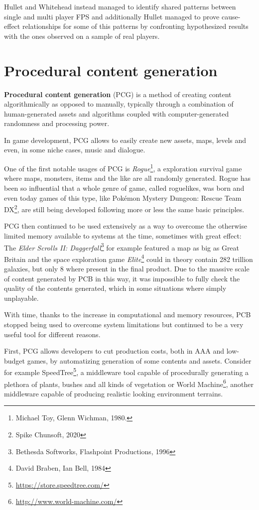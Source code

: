 Hullet and Whitehead \citep{design_patterns_fps} instead managed to identify shared patterns between single and multi player FPS and additionally Hullet \cite{science_level_design} managed to prove cause-effect relationships for some of this patterns by confronting hypothesized results with the ones observed on a sample of real players.


\section{Procedural content generation}

\textbf{Procedural content generation} (PCG) is a method of creating content algorithmically as opposed to manually, typically through a combination of human-generated assets and algorithms coupled with computer-generated randomness and processing power.

In game development, PCG allows to easily create new assets, maps, levels and even, in some niche cases, music and dialogue.

One of the first notable usages of PCG is \textit{Rogue}\footnote{Michael Toy, Glenn Wichman, 1980.}, a exploration survival game where maps, monsters, items and the like are all randomly generated. Rogue has been so influential that a whole genre of game, called roguelikes, was born and even today games of this type, like Pokémon Mystery Dungeon: Rescue Team DX\footnote{Spike Chunsoft, 2020}, are still being developed following more or less the same basic principles.

PCG then continued to be used extensively as a way to overcome the otherwise limited memory available to systems at the time, sometimes with great effect: The \textit{Elder Scrolls II: Daggerfall}\footnote{	Bethesda Softworks, Flashpoint Productions, 1996} for example featured a map as big as Great Britain and the space exploration game \textit{Elite}\footnote{David Braben, Ian Bell, 1984} could in theory contain 282 trillion galaxies, but only 8 where present in the final product.
Due to the massive scale of content generated by PCB in this way, it was impossible to fully check the quality of the contents generated, which in some situations where simply unplayable. 

With time, thanks to the increase in computational and memory resources, PCB stopped being used to overcome system limitations but continued to be a very useful tool for different reasons.

First, PCG allows developers to cut production costs, both in AAA and low-budget games, by automatizing generation of some contents and assets. Consider for example SpeedTree\footnote{\url{https://store.speedtree.com/}}, a middleware tool capable of procedurally generating a plethora of plants, bushes and all kinds of vegetation or World Machine\footnote{\url{http://www.world-machine.com/}}, another middleware capable of producing realistic looking environment terrains.

